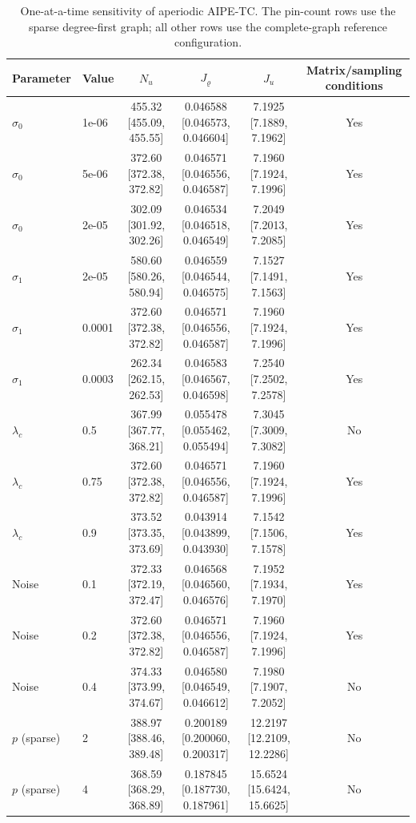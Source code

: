 \begin{table}[t]
\centering
\scriptsize
\caption{One-at-a-time sensitivity of aperiodic AIPE-TC. The pin-count rows use the sparse degree-first graph; all other rows use the complete-graph reference configuration.}
\label{tab:r4_sensitivity}
\renewcommand{\arraystretch}{1.08}
\begin{tabular}{llcccc}
\toprule
Parameter & Value & $N_u$ & $J_\varrho$ & $J_u$ & Matrix/sampling conditions \\
\midrule
$\sigma_0$ & 1e-06 & 455.32 [455.09, 455.55] & 0.046588 [0.046573, 0.046604] & 7.1925 [7.1889, 7.1962] & Yes \\
$\sigma_0$ & 5e-06 & 372.60 [372.38, 372.82] & 0.046571 [0.046556, 0.046587] & 7.1960 [7.1924, 7.1996] & Yes \\
$\sigma_0$ & 2e-05 & 302.09 [301.92, 302.26] & 0.046534 [0.046518, 0.046549] & 7.2049 [7.2013, 7.2085] & Yes \\
\addlinespace[2pt]
$\sigma_1$ & 2e-05 & 580.60 [580.26, 580.94] & 0.046559 [0.046544, 0.046575] & 7.1527 [7.1491, 7.1563] & Yes \\
$\sigma_1$ & 0.0001 & 372.60 [372.38, 372.82] & 0.046571 [0.046556, 0.046587] & 7.1960 [7.1924, 7.1996] & Yes \\
$\sigma_1$ & 0.0003 & 262.34 [262.15, 262.53] & 0.046583 [0.046567, 0.046598] & 7.2540 [7.2502, 7.2578] & Yes \\
\addlinespace[2pt]
$\lambda_c$ & 0.5 & 367.99 [367.77, 368.21] & 0.055478 [0.055462, 0.055494] & 7.3045 [7.3009, 7.3082] & No \\
$\lambda_c$ & 0.75 & 372.60 [372.38, 372.82] & 0.046571 [0.046556, 0.046587] & 7.1960 [7.1924, 7.1996] & Yes \\
$\lambda_c$ & 0.9 & 373.52 [373.35, 373.69] & 0.043914 [0.043899, 0.043930] & 7.1542 [7.1506, 7.1578] & Yes \\
\addlinespace[2pt]
Noise & 0.1 & 372.33 [372.19, 372.47] & 0.046568 [0.046560, 0.046576] & 7.1952 [7.1934, 7.1970] & Yes \\
Noise & 0.2 & 372.60 [372.38, 372.82] & 0.046571 [0.046556, 0.046587] & 7.1960 [7.1924, 7.1996] & Yes \\
Noise & 0.4 & 374.33 [373.99, 374.67] & 0.046580 [0.046549, 0.046612] & 7.1980 [7.1907, 7.2052] & No \\
\addlinespace[2pt]
$p$ (sparse) & 2 & 388.97 [388.46, 389.48] & 0.200189 [0.200060, 0.200317] & 12.2197 [12.2109, 12.2286] & No \\
$p$ (sparse) & 4 & 368.59 [368.29, 368.89] & 0.187845 [0.187730, 0.187961] & 15.6524 [15.6424, 15.6625] & No \\

\end{tabular}
\end{table}
